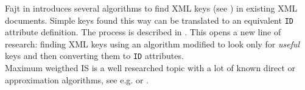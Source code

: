Fajt in \cite{fajt} introduces several algorithms to find XML keys (see \cite{keX}) in existing XML documents. Simple keys found this way can be translated to an equivalent \texttt{ID} attribute definition. The process is described in \cite[Ch.\ 9, s.\ 3]{vlist2002xml}. This opens a new line of research: finding XML keys using an algorithm modified to look only for \textit{useful} keys and then converting them to \texttt{ID} attributes.\\

Maximum weigthed IS is a well researched topic with a lot of known direct or approximation algorithms, see e.g. \cite{JM1986425} or \cite{Fomin:2009:MCA:1552285.1552286}.\\